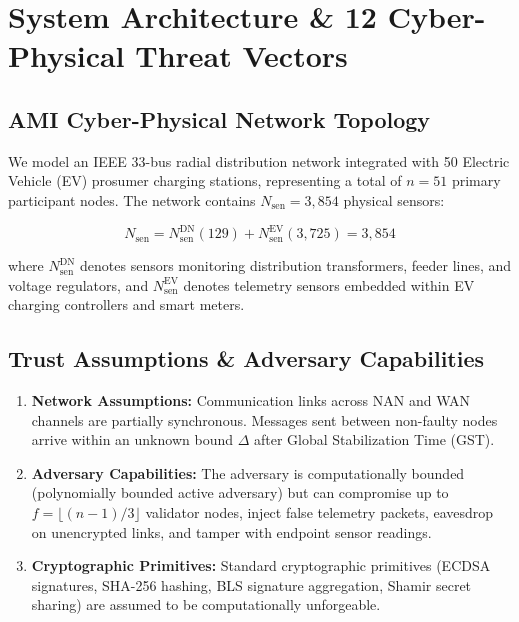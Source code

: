\documentclass[10pt,twocolumn,journal]{IEEEtran}
\begin{document}
\section{System Architecture & 12 Cyber-Physical Threat Vectors}
\label{sec:system_model}

\subsection{AMI Cyber-Physical Network Topology}
We model an IEEE 33-bus radial distribution network integrated with 50 Electric Vehicle (EV) prosumer charging stations, representing a total of $n = 51$ primary participant nodes. The network contains $N_{\text{sen}} = 3,854$ physical sensors:

\begin{equation}
N_{\text{sen}} = N_{\text{sen}}^{\text{DN}} (129) + N_{\text{sen}}^{\text{EV}} (3,725) = 3,854
\end{equation}

where $N_{\text{sen}}^{\text{DN}}$ denotes sensors monitoring distribution transformers, feeder lines, and voltage regulators, and $N_{\text{sen}}^{\text{EV}}$ denotes telemetry sensors embedded within EV charging controllers and smart meters.

\subsection{Trust Assumptions & Adversary Capabilities}
\begin{enumerate}[leftmargin=*]
    \item \textbf{Network Assumptions:} Communication links across NAN and WAN channels are partially synchronous. Messages sent between non-faulty nodes arrive within an unknown bound $\Delta$ after Global Stabilization Time (GST).
    \item \textbf{Adversary Capabilities:} The adversary is computationally bounded (polynomially bounded active adversary) but can compromise up to $f = \lfloor(n-1)/3\rfloor$ validator nodes, inject false telemetry packets, eavesdrop on unencrypted links, and tamper with endpoint sensor readings.
    \item \textbf{Cryptographic Primitives:} Standard cryptographic primitives (ECDSA signatures, SHA-256 hashing, BLS signature aggregation, Shamir secret sharing) are assumed to be computationally unforgeable.
\end{enumerate}
\end{document}
